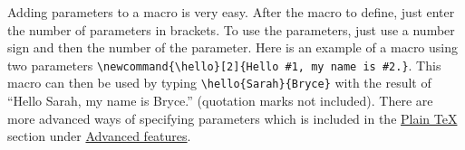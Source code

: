 Adding parameters to a macro is very easy. After the macro to define, just enter the number of parameters in brackets. To use the parameters, just use a number sign and then the number of the parameter. Here is an example of a macro using two parameters \verb=\newcommand{\hello}[2]{Hello #1, my name is #2.}=. This macro can then be used by typing \verb=\hello{Sarah}{Bryce}= with the result of \newcommand{\hello}[2]{Hello #1, my name is #2.}``\hello{Sarah}{Bryce}'' (quotation marks not included). There are more advanced ways of specifying parameters which is included in the \hyperref[section:programming/advancedFeatures/plainTeX]{Plain \TeX{}} section under \hyperref[section:programming/advancedFeatures]{Advanced features}.
